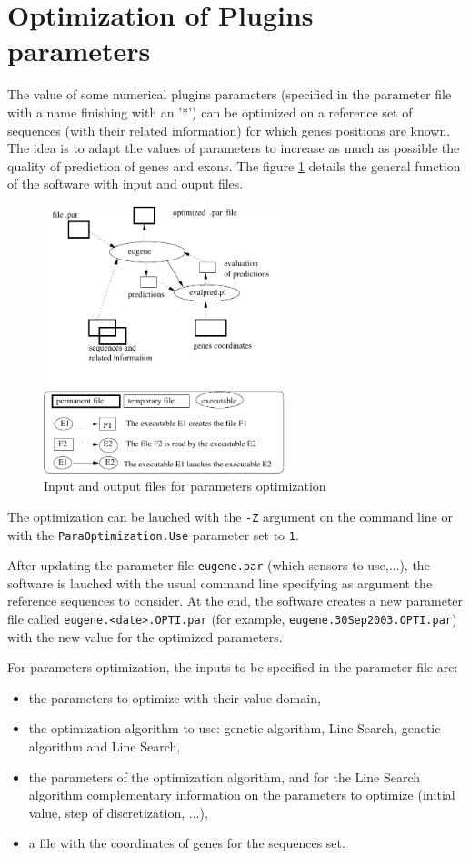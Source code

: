 \documentclass[a4paper,titlepage]{report}
\begin{document}
\section{Optimization of Plugins parameters}

The value of some numerical plugins parameters (specified in the
parameter file with a name finishing with an '*') can be optimized on
a reference set of sequences (with their related information) for
which genes positions are known. The idea is to adapt the values of
parameters to increase as much as possible the quality of prediction
of genes and exons. The figure \ref{fig:ParaOptimization} details the
general function of the software with input and ouput files.

\begin{figure}[htbp]
  \begin{center}
    \includegraphics[width=7cm]{ParaOptimization}
  \end{center}
  \caption{Input and output files for parameters optimization} 
  \label{fig:ParaOptimization}
\end{figure}

The optimization can be lauched with the \texttt{-Z} argument
 on the command line or
with the \texttt{ParaOptimi\-zation.Use} parameter set to \texttt{1}.

After updating the parameter file \texttt{eugene.par} (which sensors
to use,...), the software is lauched with the usual command line
specifying as argument the reference sequences to consider. At the
end, the software creates a new parameter file called
\texttt{eugene.<date>.OPTI.par} (for example,
\texttt{eugene.30Sep\-2003.OPTI.par}) with the new value for the
optimized parameters.

For parameters optimization, the inputs to be specified in the
parameter file are:
\begin{itemize}
\item the parameters to optimize with their value domain,
\item the optimization algorithm to use: genetic algorithm, Line
  Search, genetic algorithm and Line Search,
\item the parameters of the optimization algorithm, and for the Line
  Search algorithm complementary information on the parameters to
  optimize (initial value, step of discretization, ...),
\item a file with the coordinates of genes for the sequences set.
\end{itemize}
\end{document}
